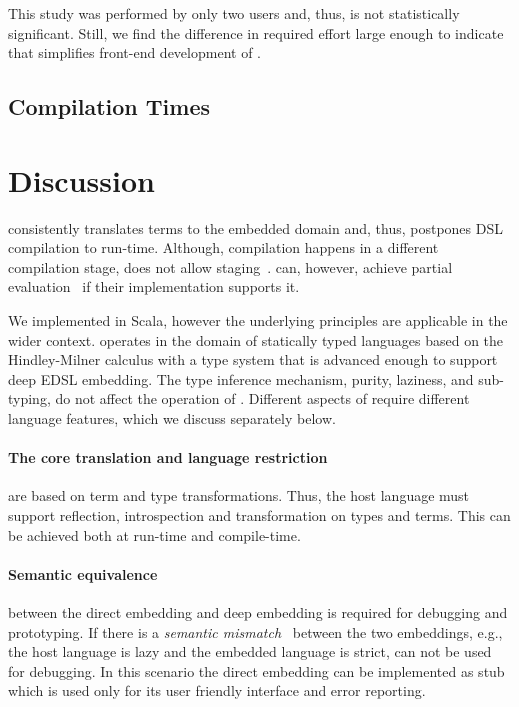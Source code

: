 This study was performed by only two users and, thus, is not statistically
significant. Still, we find the difference in required effort large enough to indicate that \yy
simplifies front-end development of \edsls.

\subsection{Compilation Times}
\label{sec:compilation-times}


\section{Discussion}
\label{sec:other-languages}


\yy consistently translates terms to the embedded domain and, thus, postpones
DSL compilation to run-time. Although, compilation happens in a different
compilation stage, \yy does not allow staging~\cite{taha_multi-stage_1997}.
\edsls can, however, achieve partial evaluation~\cite{jones1993partial} if their
implementation supports it.

We implemented \yy in Scala, however the underlying principles are applicable
in the wider context. \yy operates in the domain of statically typed languages
based on the Hindley-Milner calculus with a type system that is advanced enough
to support deep EDSL embedding. The type inference mechanism, purity, laziness,
and sub-typing, do not affect the operation of \yy. Different aspects of \yy
require different language features, which we discuss separately below.

\paragraph{The core translation and language restriction} are based on term and
type transformations. Thus, the host language must support reflection,
introspection and transformation on types and terms. This can be achieved both
at run-time and compile-time.

\paragraph{Semantic equivalence} between the direct embedding and deep embedding
is required for debugging and prototyping. If there is a \emph{semantic mismatch}~\cite{czarnecki_dsl_2004}
 between the two embeddings, e.g., the host language is lazy and the embedded
 language is strict, \yy can not be used for debugging. In this scenario the
 direct embedding can be implemented as stub which is used only for its user
 friendly interface and error reporting.


